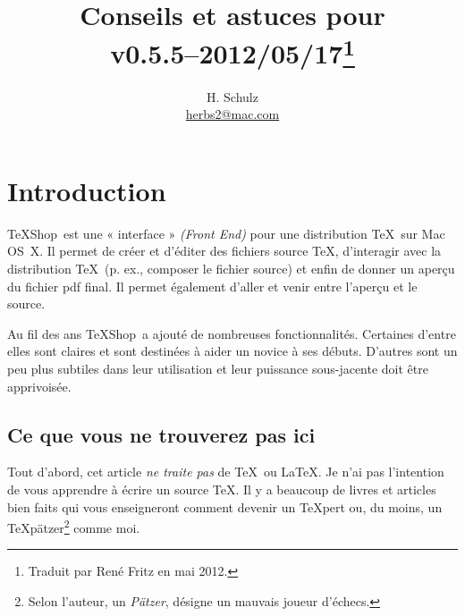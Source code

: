 \documentclass[11pt,french]{article}
\title{Conseils et astuces pour \TS\\\small v0.5.5--2012/05/17\thanks{Traduit par René Fritz en mai 2012.}}
\author{H. Schulz\\\small\href{mailto:herbs2@mac.com}{herbs2@mac.com}}
\date{}
\newcommand{\TS}{\textsf{\TeX Shop}}
\newcommand{\acr}[1]{\textsf{#1}}
\begin{document}
\maketitle

\tableofcontents

\newpage

\section{Introduction}

\TS\ est une « interface » \emph{(Front End)} pour une distribution \TeX\ sur Mac OS~X. Il permet de créer et d'éditer des fichiers source \TeX{}, d'interagir avec la distribution \TeX\ (p. ex., composer le fichier source) et enfin de donner un aperçu du fichier \acr{pdf} final. Il permet également d'aller et venir entre l'aperçu et le source.


Au fil des ans \TS\ a ajouté de nombreuses fonctionnalités. Certaines d'entre elles sont claires et sont destinées à aider un novice à ses débuts. D'autres sont un peu plus subtiles dans leur utilisation et leur puissance sous-jacente doit être apprivoisée.


\subsection{Ce que vous ne trouverez pas ici}

Tout d'abord, cet article \emph{ne traite pas} de \TeX\ ou \LaTeX. Je n'ai pas l'intention de vous apprendre à écrire un source \TeX{}. Il y a beaucoup de livres et articles bien faits qui vous enseigneront comment devenir un \TeX pert ou, du moins, un \TeX pätzer\footnote{Selon l'auteur, un \emph{Pätzer}, désigne un mauvais joueur d'échecs.} comme moi.
 
\end{document}
